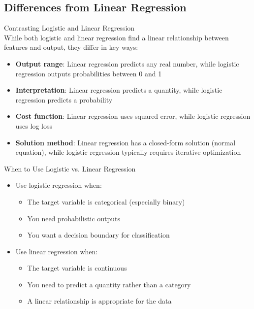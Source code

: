 \subsection{Differences from Linear Regression}

\begin{concept}{Contrasting Logistic and Linear Regression}\\
While both logistic and linear regression find a linear relationship between features and output, they differ in key ways:
\begin{itemize}
    \item \textbf{Output range}: Linear regression predicts any real number, while logistic regression outputs probabilities between 0 and 1
    \item \textbf{Interpretation}: Linear regression predicts a quantity, while logistic regression predicts a probability
    \item \textbf{Cost function}: Linear regression uses squared error, while logistic regression uses log loss
    \item \textbf{Solution method}: Linear regression has a closed-form solution (normal equation), while logistic regression typically requires iterative optimization
\end{itemize}
\end{concept}

\begin{concept}{When to Use Logistic vs. Linear Regression}
\begin{itemize}
    \item Use logistic regression when:
    \begin{itemize}
        \item The target variable is categorical (especially binary)
        \item You need probabilistic outputs
        \item You want a decision boundary for classification
    \end{itemize}
    \item Use linear regression when:
    \begin{itemize}
        \item The target variable is continuous
        \item You need to predict a quantity rather than a category
        \item A linear relationship is appropriate for the data
    \end{itemize}
\end{itemize}
\end{concept}

